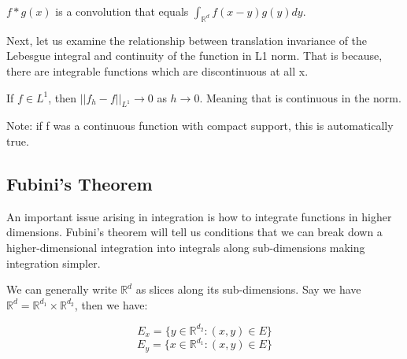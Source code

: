 \documentclass[class=article, crop=false]{standalone}
\begin{document}
			\begin{definition} [Convolution]
				$f*g(x)$ is a convolution that equals $\int_{\mathbb{R}^d} f(x-y)g(y)dy$.
			\end{definition}

			Next, let us examine the relationship between translation invariance of the Lebesgue integral and continuity of the function in L1 norm. That is because, there are integrable functions which are discontinuous at all x.

			\begin{lemma}
				If $f \in L^1$, then $||f_h - f||_{L^1} \rightarrow 0$ as $h \rightarrow 0$. Meaning that is continuous in the norm.

				Note: if f was a continuous function with compact support, this is automatically true.
			\end{lemma}
	\subsection{Fubini's Theorem}
		An important issue arising in integration is how to integrate functions in higher dimensions. Fubini's theorem will tell us conditions that we can break down a higher-dimensional integration into integrals along sub-dimensions making integration simpler.

		We can generally write $\mathbb{R}^d$ as slices along its sub-dimensions. Say we have $\mathbb{R}^d = \mathbb{R}^{d_1} \times \mathbb{R}^{d_2}$, then we have:

			$$E_x = \{y \in \mathbb{R}^{d_2}: (x, y) \in E\}$$
			$$E_y = \{x \in \mathbb{R}^{d_1}: (x, y) \in E\}$$
\end{document}
